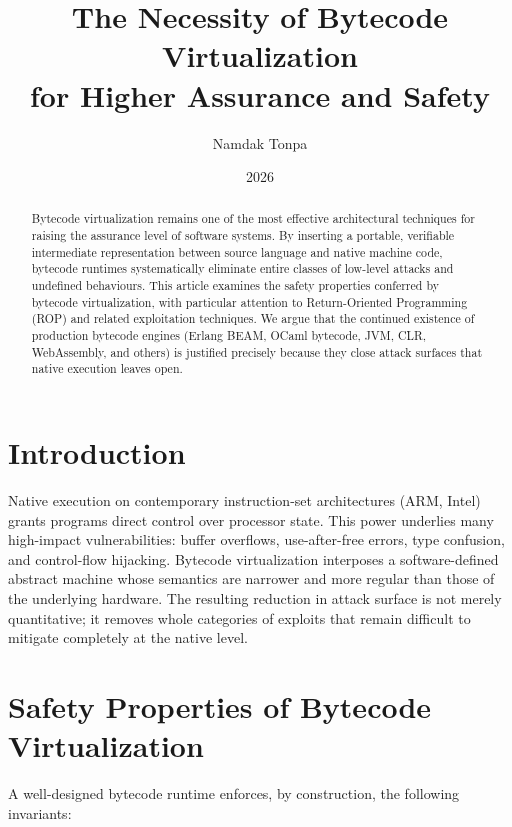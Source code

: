 \documentclass{article}
\title{The Necessity of Bytecode Virtualization\\for Higher Assurance and Safety}
\author{Namdak Tonpa}
\date{2026}
\begin{document}
\maketitle

\begin{abstract}
Bytecode virtualization remains one of the most effective architectural techniques for raising the assurance level of software systems. By inserting a portable, verifiable intermediate representation between source language and native machine code, bytecode runtimes systematically eliminate entire classes of low-level attacks and undefined behaviours. This article examines the safety properties conferred by bytecode virtualization, with particular attention to Return-Oriented Programming (ROP) and related exploitation techniques. We argue that the continued existence of production bytecode engines (Erlang BEAM, OCaml bytecode, JVM, CLR, WebAssembly, and others) is justified precisely because they close attack surfaces that native execution leaves open.
\end{abstract}

\section{Introduction}

Native execution on contemporary instruction-set architectures (ARM, Intel) grants programs direct control over processor state. This power underlies many high-impact vulnerabilities: buffer overflows, use-after-free errors, type confusion, and control-flow hijacking. Bytecode virtualization interposes a software-defined abstract machine whose semantics are narrower and more regular than those of the underlying hardware. The resulting reduction in attack surface is not merely quantitative; it removes whole categories of exploits that remain difficult to mitigate completely at the native level.

\section{Safety Properties of Bytecode Virtualization}

A well-designed bytecode runtime enforces, by construction, the following invariants:
\end{document}
